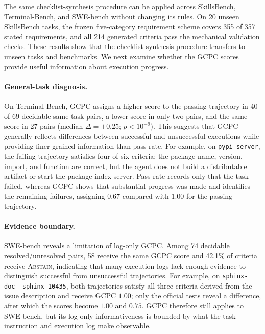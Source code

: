 \documentclass[sigconf,nonacm]{acmart}
\newcommand{\abstain}{\textsc{Abstain}}
\begin{document}
The same checklist-synthesis procedure can be applied across SkillsBench, Terminal-Bench, and SWE-bench without changing its rules. On 20 unseen SkillsBench tasks, the frozen five-category requirement scheme covers 355 of 357 stated requirements, and all 214 generated criteria pass the mechanical validation checks. These results show that the checklist-synthesis procedure transfers to unseen tasks and benchmarks. We next examine whether the GCPC scores provide useful information about execution progress.

\paragraph{General-task diagnosis.}
On Terminal-Bench, GCPC assigns a higher score to the passing trajectory in
40 of 69 decidable same-task pairs, a lower score in only two pairs, and the
same score in 27 pairs (median $\Delta=+0.25$; $p<10^{-9}$). This suggests
that GCPC generally reflects differences between successful and unsuccessful
executions while providing finer-grained information than pass rate. For example, on \texttt{pypi-server}, the failing trajectory satisfies four
of six criteria: the package name, version, import, and function are correct,
but the agent does not build a distributable artifact or start the
package-index server. Pass rate records only that the task failed, whereas
GCPC shows that substantial progress was made and identifies the remaining
failures, assigning $0.67$ compared with $1.00$ for the passing trajectory.

\paragraph{Evidence boundary.}
SWE-bench reveals a limitation of log-only GCPC. Among 74 decidable
resolved/unresolved pairs, 58 receive the same GCPC score and 42.1\% of
criteria receive \abstain{}, indicating that many execution logs lack enough
evidence to distinguish successful from unsuccessful trajectories. For
example, on \texttt{sphinx-doc\_\_sphinx-10435}, both trajectories satisfy all
three criteria derived from the issue description and receive GCPC $1.00$;
only the official tests reveal a difference, after which the scores become
$1.00$ and $0.75$. GCPC therefore still applies to SWE-bench, but its
log-only informativeness is bounded by what the task instruction and
execution log make observable.
\end{document}
